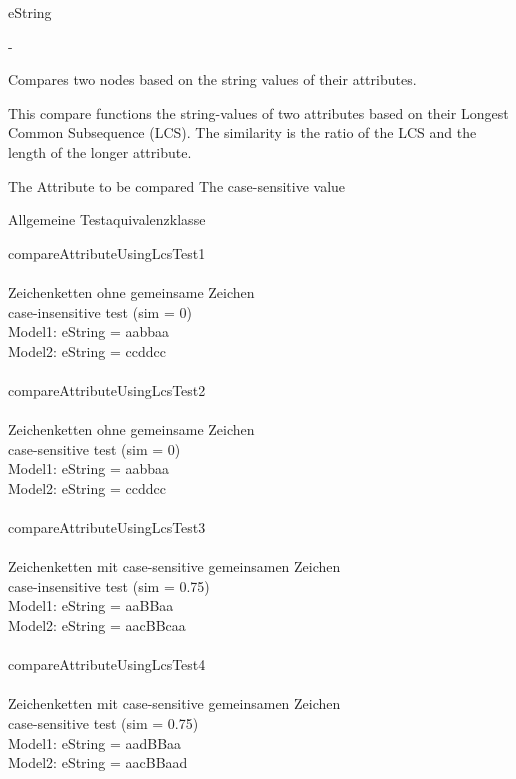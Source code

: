 
\allowedtypes
eString

\precondition
-

\semantics
Compares two nodes based on the string values of their attributes.

\returnvalue
This compare functions the string-values of two attributes based on their Longest Common Subsequence (LCS). 
The similarity is the ratio of the LCS and the length of the longer attribute.		

\parameters
The Attribute to be compared 
The case-sensitive value

\exceptions


\test	
Allgemeine Testaquivalenzklasse


compareAttributeUsingLcsTest1\\\\
Zeichenketten ohne gemeinsame Zeichen\\
case-insensitive test (sim = 0)\\
Model1: eString = aabbaa\\
Model2: eString = ccddcc\\\\

compareAttributeUsingLcsTest2\\\\
Zeichenketten ohne gemeinsame Zeichen\\
case-sensitive test (sim = 0)\\
Model1: eString = aabbaa\\
Model2: eString = ccddcc\\\\

compareAttributeUsingLcsTest3\\\\
Zeichenketten mit case-sensitive gemeinsamen Zeichen\\
case-insensitive test (sim = 0.75)\\
Model1: eString = aaBBaa\\
Model2: eString = aacBBcaa\\\\

compareAttributeUsingLcsTest4\\\\
Zeichenketten mit case-sensitive gemeinsamen Zeichen\\
case-sensitive test (sim = 0.75)\\
Model1: eString = aadBBaa\\
Model2: eString = aacBBaad\\\\

